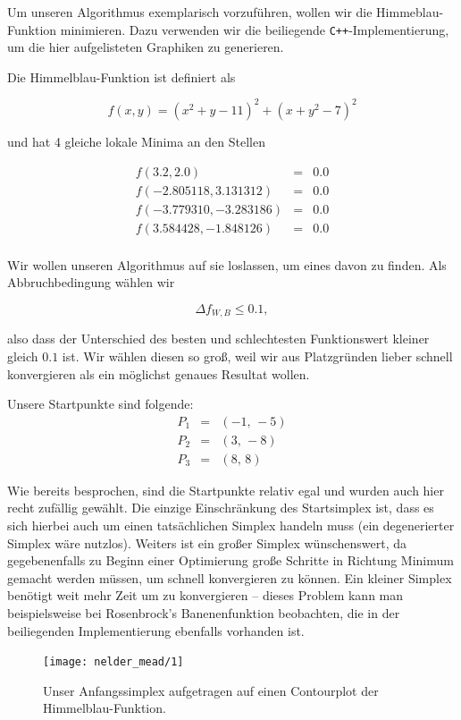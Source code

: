 \documentclass[naustrian]{article}
\begin{document}
{Um unseren Algorithmus exemplarisch vorzuführen, wollen wir die Himmeblau-
Funktion minimieren. Dazu verwenden wir die beiliegende {\tt C++}-Implementierung, um
die hier aufgelisteten Graphiken zu generieren.

Die Himmelblau-Funktion ist definiert als

\[
    f(x,y) = (x^2 + y - 11)^2 + (x + y^2 - 7)^2
\]

und hat 4 gleiche lokale Minima an den Stellen

\begin{eqnarray*}
    f(3.2, 2.0) & = & 0.0\\
    f(-2.805118, 3.131312) & = & 0.0\\
    f(-3.779310, -3.283186) & = & 0.0\\
    f(3.584428, -1.848126) & = & 0.0\\
\end{eqnarray*}

Wir wollen unseren Algorithmus auf sie loslassen, um eines davon zu finden. Als
Abbruchbedingung wählen wir

\[
    \Delta f_{W,B} \leq 0.1,
\]

also dass der Unterschied des besten und schlechtesten Funktionswert kleiner
gleich $0.1$ ist. Wir wählen diesen so groß, weil wir aus Platzgründen lieber
schnell konvergieren als ein möglichst genaues Resultat wollen.

Unsere Startpunkte sind folgende:
\begin{eqnarray*}
    P_{1} & = & (-1,\,-5)\\
    P_{2} & = & (3,\,-8)\\
    P_{3} & = & (8,\,8)
\end{eqnarray*}

Wie bereits besprochen, sind die Startpunkte relativ egal und wurden auch hier
recht zufällig gewählt. Die einzige Einschränkung des Startsimplex ist, dass es
sich hierbei auch um einen tatsächlichen Simplex handeln muss (ein
degenerierter Simplex wäre nutzlos). Weiters ist ein großer Simplex
wünschenswert, da gegebenenfalls zu Beginn einer Optimierung große Schritte in
Richtung Minimum gemacht werden müssen, um schnell konvergieren zu können. Ein
kleiner Simplex benötigt weit mehr Zeit um zu konvergieren -- dieses Problem
kann man beispielsweise bei Rosenbrock's Banenenfunktion beobachten, die in der
beiliegenden Implementierung ebenfalls vorhanden ist.

\begin{figure}[H]
    \centering
    \texttt{[image: nelder\_mead/1]}
    \caption{Unser Anfangssimplex aufgetragen auf einen Contourplot der Himmelblau-Funktion.}
\end{figure}

}
\end{document}
